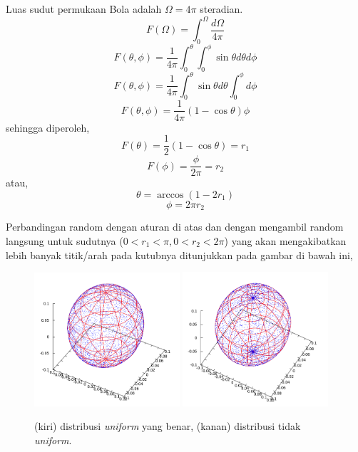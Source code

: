 \documentclass[paper=a4, fontsize=11pt]{scrartcl}
\numberwithin{equation}{section} %
\numberwithin{figure}{section} %
\numberwithin{table}{section} %
\begin{document}
Luas sudut permukaan Bola adalah $\Omega = 4\pi$ steradian.
\begin{equation*}
F(\Omega) = \int_{0}^{\Omega} \frac{d\Omega}{4\pi}
\end{equation*}
\begin{equation*}
F(\theta, \phi) = \frac{1}{4\pi} \int_{0}^{\theta} \int_{0}^{\phi} \sin \theta d\theta d\phi
\end{equation*}
\begin{equation*}
F(\theta, \phi) = \frac{1}{4\pi} \int_{0}^{\theta} \sin \theta d\theta \int_{0}^{\phi} d\phi
\end{equation*}
\begin{equation*}
F(\theta, \phi) = \frac{1}{4\pi} (1 - \cos \theta) \phi
\end{equation*}
sehingga diperoleh,
\begin{equation*}
F(\theta) = \frac{1}{2} (1 - \cos \theta) = r_{1}
\end{equation*}
\begin{equation*}
F(\phi) = \frac{\phi}{2\pi} = r_{2}
\end{equation*}
atau,
\begin{equation*}
\theta = \arccos (1 - 2 r_{1})
\end{equation*}
\begin{equation*}
\phi = 2 \pi r_{2}
\end{equation*}

Perbandingan random dengan aturan di atas dan dengan mengambil random langsung untuk sudutnya ($ 0 < r_1 < \pi,  0 < r_2 < 2\pi$) yang akan mengakibatkan lebih banyak titik/arah pada kutubnya ditunjukkan pada gambar di bawah ini,
\begin{figure}
	\centering
	\includegraphics[width=0.48\textwidth]{distribusibola-benar.png}
	\includegraphics[width=0.48\textwidth]{distribusibola-salah.png}
	\caption{(kiri) distribusi \textit{uniform} yang benar, (kanan) distribusi tidak \textit{uniform}.}
\end{figure}
\end{document}
